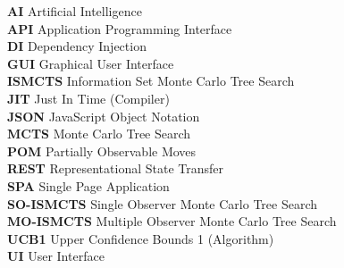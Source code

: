 
\textbf{AI} Artificial Intelligence \\
\textbf{API} Application Programming Interface \\
\textbf{DI} Dependency Injection \\
\textbf{GUI} Graphical User Interface \\
\textbf{ISMCTS} Information Set Monte Carlo Tree Search \\
\textbf{JIT} Just In Time (Compiler) \\
\textbf{JSON} JavaScript Object Notation \\
\textbf{MCTS} Monte Carlo Tree Search \\
\textbf{POM} Partially Observable Moves \\
\textbf{REST} Representational State Transfer \\
\textbf{SPA} Single Page Application \\
\textbf{SO-ISMCTS} Single Observer Monte Carlo Tree Search\\
\textbf{MO-ISMCTS} Multiple Observer Monte Carlo Tree Search\\
\textbf{UCB1} Upper Confidence Bounds 1 (Algorithm) \\
\textbf{UI} User Interface
